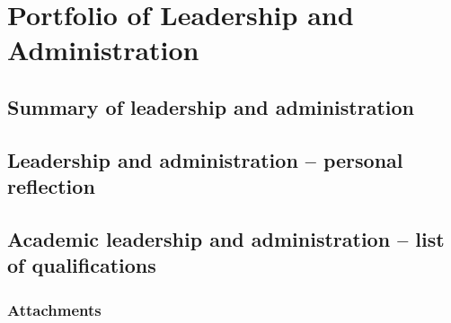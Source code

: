 \chapter{Portfolio of Leadership and Administration}

\section{Summary of leadership and administration}

\section{Leadership and administration -- personal reflection}

\section{Academic leadership and administration -- list of qualifications}

\subsection{Attachments}

